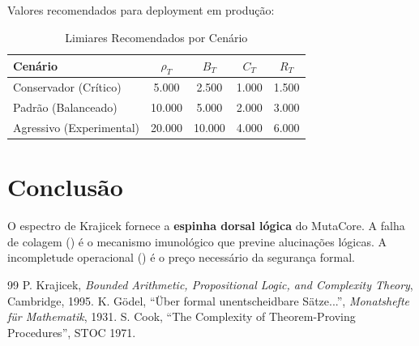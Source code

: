 \documentclass[11pt,a4paper]{article}
\newcommand{\rhoT}{\rho_T}
\newcommand{\BT}{B_T}
\newcommand{\CT}{C_T}
\newcommand{\RT}{R_T}
\begin{document}
Valores recomendados para deployment em produção:

\begin{table}[htbp]
\centering
\caption{Limiares Recomendados por Cenário}
\label{tab:thresholds}
\begin{tabular}{@{}lcccc@{}}
\toprule
\textbf{Cenário} & $\rhoT$ & $\BT$ & $\CT$ & $\RT$ \\
\midrule
Conservador (Crítico) & 5.000 & 2.500 & 1.000 & 1.500 \\
Padrão (Balanceado) & 10.000 & 5.000 & 2.000 & 3.000 \\
Agressivo (Experimental) & 20.000 & 10.000 & 4.000 & 6.000 \\
\bottomrule
\end{tabular}
\end{table}

\section{Conclusão}

O espectro de Krajicek fornece a \textbf{espinha dorsal lógica} do MutaCore. A falha de colagem () é o mecanismo imunológico que previne alucinações lógicas. A incompletude operacional () é o preço necessário da segurança formal.


\begin{thebibliography}{99}
 P. Krajicek, \textit{Bounded Arithmetic, Propositional Logic, and Complexity Theory}, Cambridge, 1995.
 K. Gödel, ``Über formal unentscheidbare Sätze...'', \textit{Monatshefte für Mathematik}, 1931.
 S. Cook, ``The Complexity of Theorem-Proving Procedures'', STOC 1971.
\end{thebibliography}
\end{document}

